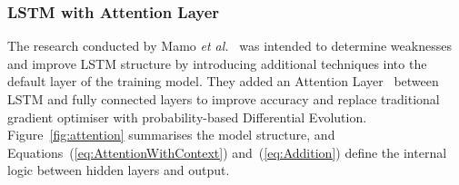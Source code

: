 \subsubsection{LSTM with Attention Layer}
The research conducted by Mamo \textit{et al.}~\cite{mamo_long_2020} was intended to determine weaknesses and improve LSTM structure by introducing additional techniques into the default layer of the training model. 
They added an Attention Layer~\cite{yang_hierarchical_2016} between LSTM and fully connected layers to improve accuracy and replace traditional gradient optimiser with probability-based Differential Evolution.
\mbox{Figure~\ref{fig:attention}} summarises the model structure, and \mbox{Equations~(\ref{eq:AttentionWithContext})} and~(\ref{eq:Addition}) define the internal logic between hidden layers and output.

